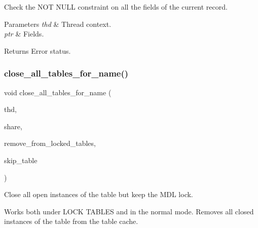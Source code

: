 Check the N\+OT N\+U\+LL constraint on all the fields of the current record.


\begin{DoxyParams}{Parameters}
{\em thd} & Thread context. \\
\hline
{\em ptr} & Fields.\\
\hline
\end{DoxyParams}
\begin{DoxyReturn}{Returns}
Error status. 
\end{DoxyReturn}
\mbox{\label{group__Data__Dictionary_ga86713fadf907edf57606406a10c1f994}} 
\subsubsection{\texorpdfstring{close\+\_\+all\+\_\+tables\+\_\+for\+\_\+name()}{close\_all\_tables\_for\_name()}}
{\footnotesize\ttfamily void close\+\_\+all\+\_\+tables\+\_\+for\+\_\+name (\begin{DoxyParamCaption}\item[{T\+HD $\ast$}]{thd,  }\item[{\mbox{\hyperlink{structTABLE__SHARE}{T\+A\+B\+L\+E\+\_\+\+S\+H\+A\+RE}} $\ast$}]{share,  }\item[{bool}]{remove\+\_\+from\+\_\+locked\+\_\+tables,  }\item[{\mbox{\hyperlink{structTABLE}{T\+A\+B\+LE}} $\ast$}]{skip\+\_\+table }\end{DoxyParamCaption})}

Close all open instances of the table but keep the M\+DL lock.

Works both under L\+O\+CK T\+A\+B\+L\+ES and in the normal mode. Removes all closed instances of the table from the table cache.


